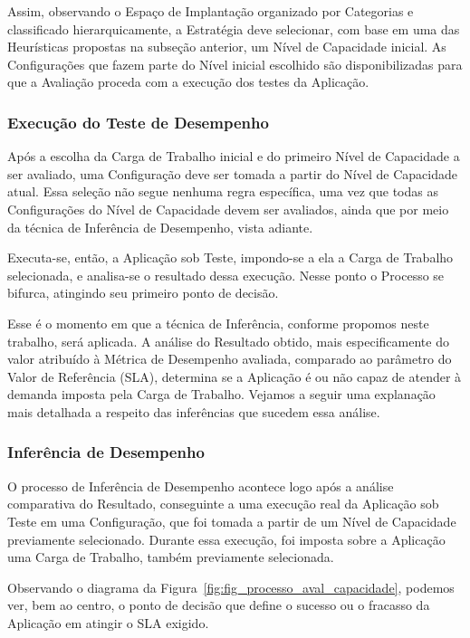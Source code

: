 \documentclass[12pt]{article}
\begin{document}
Assim, observando o Espaço de Implantação organizado por Categorias e classificado
hierarquicamente, a Estratégia deve selecionar, com base em uma das Heurísticas 
propostas na subseção anterior, um Nível de Capacidade inicial. As 
Configurações que fazem parte do Nível inicial escolhido são disponibilizadas 
para que a Avaliação proceda com a execução dos testes da Aplicação.

\subsubsection{Execução do Teste de Desempenho}
\label{subsec:processo_execucao}
Após a escolha da Carga de Trabalho inicial e do primeiro Nível de Capacidade a
ser avaliado, uma Configuração deve ser tomada a partir do Nível de Capacidade 
atual. Essa seleção não segue nenhuma regra específica, uma vez que todas as 
Configurações do Nível de Capacidade devem ser avaliados, ainda que por meio da técnica de 
Inferência de Desempenho, vista adiante.
 
Executa-se, então, a Aplicação sob Teste, impondo-se a ela a Carga de Trabalho 
selecionada, e analisa-se o resultado dessa execução. Nesse ponto o Processo se 
bifurca, atingindo seu primeiro ponto de decisão.

Esse é o momento em que a técnica de Inferência, conforme propomos neste trabalho,
será aplicada. A análise do Resultado obtido, mais especificamente do valor atribuído
à Métrica de Desempenho avaliada, comparado ao parâmetro do Valor de Referência (SLA), 
determina se a Aplicação é ou não capaz de atender à demanda imposta pela
Carga de Trabalho. Vejamos a seguir uma explanação mais detalhada a respeito das
inferências que sucedem essa análise.  

\subsubsection{Inferência de Desempenho}
O processo de Inferência de Desempenho acontece logo após a análise comparativa
do Resultado, conseguinte a uma execução real da Aplicação sob Teste em uma 
Configuração, que foi tomada a partir de um Nível de Capacidade previamente 
selecionado. Durante essa execução, foi imposta sobre a Aplicação uma Carga de 
Trabalho, também previamente selecionada.

Observando o diagrama da Figura~\ref{fig:fig_processo_aval_capacidade}, podemos 
ver, bem ao centro, o ponto de decisão que define o sucesso ou o fracasso da 
Aplicação em atingir o SLA exigido. 
\end{document}
